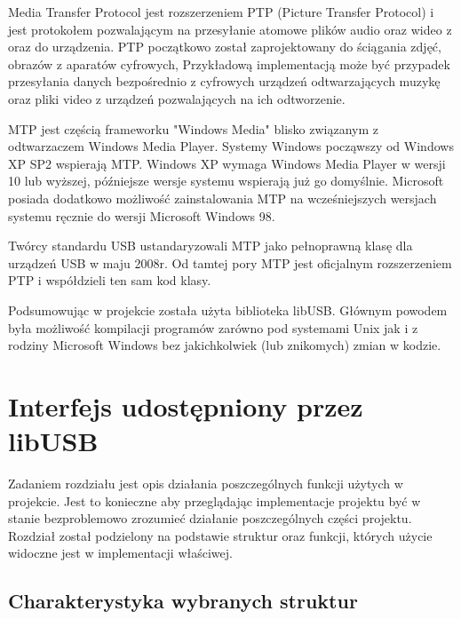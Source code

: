\documentclass{BscUS}
\begin{document}
Media Transfer Protocol jest rozszerzeniem PTP (Picture Transfer Protocol) i jest protokołem pozwalającym na przesyłanie atomowe plików audio oraz wideo z oraz do urządzenia. PTP początkowo został zaprojektowany do ściągania zdjęć, obrazów z aparatów cyfrowych, Przykładową implementacją może być przypadek przesyłania danych bezpośrednio z cyfrowych urządzeń odtwarzających muzykę oraz pliki video z urządzeń pozwalających na ich odtworzenie.

MTP jest częścią frameworku "Windows Media" blisko związanym z odtwarzaczem Windows Media Player. Systemy Windows począwszy od Windows XP SP2 wspierają MTP. Windows XP wymaga Windows Media Player w wersji 10 lub wyższej, późniejsze wersje systemu wspierają już go domyślnie. Microsoft posiada dodatkowo możliwość zainstalowania MTP na wcześniejszych wersjach systemu ręcznie do wersji Microsoft Windows 98.

Twórcy standardu USB ustandaryzowali MTP jako pełnoprawną klasę dla urządzeń USB w maju 2008r.
Od tamtej pory MTP jest oficjalnym rozszerzeniem PTP i współdzieli ten sam kod klasy. \cite{winusbDesc, micrDevAppUSBDev, micrAccUsbDev, micCommWithUsb}
\newline

\indent Podsumowując w projekcie została użyta biblioteka libUSB. Głównym powodem była możliwość kompilacji programów zarówno pod systemami Unix jak i z rodziny Microsoft Windows bez jakichkolwiek (lub znikomych) zmian w kodzie.

\chapter{Interfejs udostępniony przez libUSB}
\label{libUsbChapter}
\indent Zadaniem rozdziału jest opis działania poszczególnych funkcji użytych w projekcie. Jest to konieczne aby przeglądając implementacje projektu być w stanie bezproblemowo zrozumieć działanie poszczególnych części projektu. Rozdział został podzielony na podstawie struktur oraz funkcji, których użycie widoczne jest w implementacji właściwej. \cite{libusbDoc}
\section{Charakterystyka wybranych struktur}
\end{document}
